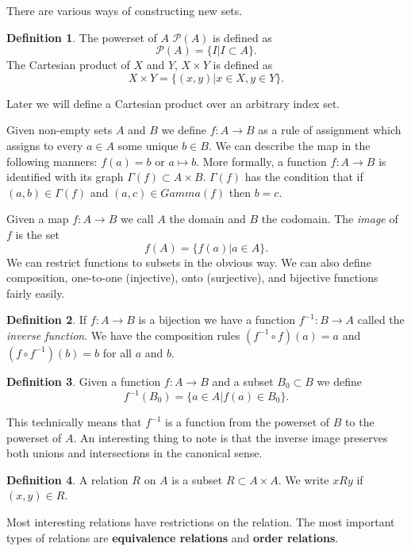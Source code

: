 \documentclass[12pt]{article}
\theoremstyle{plain}
\theoremstyle{definition}
\newtheorem{definition}{Definition}
\begin{document}
There are various ways of constructing new sets.

\begin{definition}
The powerset of $A$ $\mathcal{P}(A)$ is defined as 
\[\mathcal{P}(A) = \{I | I \subset A\}.\]
The Cartesian product of $X$ and $Y$, $X \times Y$ is defined as 
\[X \times Y = \{(x, y) | x \in X, y \in Y\}.\]
\end{definition}

Later we will define a Cartesian product over an arbitrary index set.

Given non-empty sets $A$ and $B$ we define $f:A \to B$ as a rule of assignment which assigns to every $a \in A$ some unique $b \in B$. We can describe the map in the following manners: $f(a) = b$ or $a \mapsto b$. More formally, a function $f: A \to B$ is identified with its graph $\Gamma(f) \subset A \times B$. $\Gamma(f)$ has the condition that if $(a, b) \in \Gamma(f)$ and $(a, c) \in Gamma(f)$ then $b = c$.

Given a map $f: A \to B$ we call $A$ the domain and $B$ the codomain. The \textit{image} of $f$ is the set 
\[f(A) = \{f(a) | a \in A\}.\]
We can restrict functions to subsets in the obvious way. We can also define composition, one-to-one (injective), onto (surjective), and bijective functions fairly easily.

\begin{definition}
If $f:A \to B$ is a bijection we have a function $f^{-1}:B \to A$ called the \textit{inverse function}. We have the composition rules $(f^{-1} \circ f)(a) = a$ and $(f \circ f^{-1})(b) = b$ for all $a$ and $b$.
\end{definition}

\begin{definition}
Given a function $f: A \to B$ and a subset $B_0 \subset B$ we define 
\[f^{-1}(B_0) = \{a \in A | f(a) \in B_0\}.\]

This technically means that $f^{-1}$ is a function from the powerset of $B$ to the powerset of $A$. An interesting thing to note is that the inverse image preserves both unions and intersections in the canonical sense.
\end{definition}

\begin{definition}
A relation $R$ on $A$ is a subset $R \subset A \times A$. We write $xRy$ if $(x, y) \in R$. 
\end{definition}

Most interesting relations have restrictions on the relation. The most important types of relations are \textbf{equivalence relations} and \textbf{order relations}.
\end{document}
